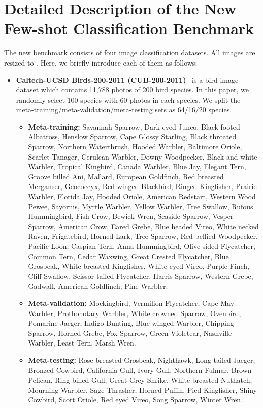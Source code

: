 \documentclass{article}
\begin{document}
\section{Detailed Description of the New Few-shot Classification Benchmark}
\label{app:metadataset}
The new benchmark consists of four image classification datasets. All images are resized to . Here, we briefly introduce each of them as follows:
\begin{itemize}[leftmargin=*]
    \item \textbf{Caltech-UCSD Birds-200-2011 (CUB-200-2011)}~\cite{WahCUB_200_2011} is a bird image dataset which contains 11,788 photos of 200 bird species. In this paper, we randomly select 100 species with 60 photos in each species. We split the meta-training/meta-validation/meta-testing sets as 64/16/20 species. 
    \begin{itemize}
    \small
        \item \textbf{Meta-training:} Savannah Sparrow, Dark eyed Junco, Black footed Albatross, Henslow Sparrow, Cape Glossy Starling, Black throated Sparrow, Northern Waterthrush, Hooded Warbler, Baltimore Oriole, Scarlet Tanager, Cerulean Warbler, Downy Woodpecker, Black and white Warbler, Tropical Kingbird, Canada Warbler, Blue Jay, Elegant Tern, Groove billed Ani, Mallard, European Goldfinch, Red breasted Merganser, Geococcyx, Red winged Blackbird, Ringed Kingfisher, Prairie Warbler, Florida Jay, Hooded Oriole, American Redstart, Western Wood Pewee, Sayornis, Myrtle Warbler, Yellow Warbler, Tree Swallow, Rufous Hummingbird, Fish Crow, Bewick Wren, Seaside Sparrow, Vesper Sparrow, American Crow, Eared Grebe, Blue headed Vireo, White necked Raven, Frigatebird, Horned Lark, Tree Sparrow, Red bellied Woodpecker, Pacific Loon, Caspian Tern, Anna Hummingbird, Olive sided Flycatcher, Common Tern, Cedar Waxwing, Great Crested Flycatcher, Blue Grosbeak, White breasted Kingfisher, White eyed Vireo, Purple Finch, Cliff Swallow, Scissor tailed Flycatcher, Harris Sparrow, Western Grebe, Gadwall, American Goldfinch, Pine Warbler.
        \item \textbf{Meta-validation:} Mockingbird, Vermilion Flycatcher, Cape May Warbler, Prothonotary Warbler, White crowned Sparrow, Ovenbird, Pomarine Jaeger, Indigo Bunting, Blue winged Warbler, Chipping Sparrow, Horned Grebe, Fox Sparrow, Green Violetear, Nashville Warbler, Least Tern, Marsh Wren.
        \item \textbf{Meta-testing:} Rose breasted Grosbeak, Nighthawk, Long tailed Jaeger, Bronzed Cowbird, California Gull, Ivory Gull, Northern Fulmar, Brown Pelican, Ring billed Gull, Great Grey Shrike, White breasted Nuthatch, Mourning Warbler, Sage Thrasher, Horned Puffin, Pied Kingfisher, Shiny Cowbird, Scott Oriole, Red eyed Vireo, Song Sparrow, Winter Wren.

\end{itemize}
\end{itemize}
\end{document}
